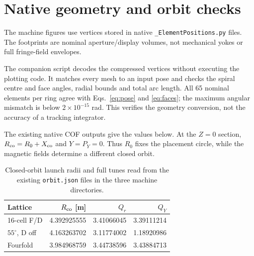 \documentclass[11pt,a4paper]{article}
\newcommand{\degunit}{^{\circ}}
\begin{document}
\section{Native geometry and orbit checks}
The machine figures use vertices stored in native
\texttt{\_ElementPositions.py} files. The footprints are nominal aperture/display
volumes, not mechanical yokes or full fringe-field envelopes.

The companion script decodes the compressed vertices without executing the
plotting code. It matches every mesh to an input pose and checks the spiral
centre and face angles, radial bounds and total arc length. All 65 nominal
elements per ring agree with Eqs.~\eqref{eq:pose} and \eqref{eq:faces}; the maximum
angular mismatch is below $2\times10^{-15}$ rad. This verifies the geometry
conversion, not the accuracy of a tracking integrator.

The existing native COF outputs give the values below. At the $Z=0$ section,
$R_{\rm co}=R_0+X_{\rm co}$ and $Y=P_Y=0$. Thus $R_0$ fixes the placement circle,
while the magnetic fields determine a different closed orbit. \\
\begin{table}[ht]
\centering
\caption{Closed-orbit launch radii and full tunes read from the existing
\texttt{orbit.json} files in the three machine directories.}
\begin{tabular}{@{}lrrr@{}}
\toprule
Lattice & $R_{\rm co}$ [m] & $Q_r$ & $Q_Y$\\
\midrule
16-cell F/D & 4.392925555 & 3.41066045 & 3.39111214\\
$55\degunit$, D off & 4.163263702 & 3.11774002 & 1.18920986\\
Fourfold & 3.984968759 & 3.44738596 & 3.43884713\\
\bottomrule
\end{tabular}
\end{table}

\end{document}

